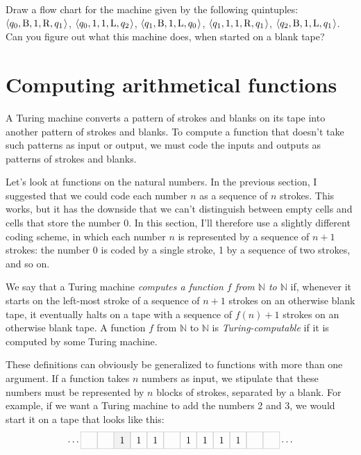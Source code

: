 \begin{exercise}\label{ex:bb3}
  Draw a flow chart for the machine given by the following quintuples:
  $\t{q_0, \mathrm{B}, 1, \mathrm{R}, q_1}$,
  $\t{q_0, 1, 1, \mathrm{L}, q_2}$,
  $\t{q_1, \mathrm{B}, 1, \mathrm{L}, q_{0}}$,
  $\t{q_1, 1, 1, \mathrm{R}, q_{1}}$,
  $\t{q_2, \mathrm{B}, 1, \mathrm{L}, q_{1}}$.
  Can you figure out what this machine does,
  when started on a blank tape?
%
\end{exercise}


\section{Computing arithmetical functions}\label{sec:tm-arith}

A Turing machine converts a pattern of strokes and blanks on its tape into another pattern of strokes and blanks.
To compute a function that
doesn't take such patterns as input or output,
we must code the inputs and outputs as patterns of strokes and blanks.

Let's look at functions on the natural numbers.
In the previous section,
I suggested that we could code each number $n$ as a sequence of $n$ strokes.
This works,
but it has the downside that
we can't distinguish between empty cells and cells that store the number 0.
In this section,
I'll therefore use a slightly different coding scheme,
in which
each number $n$ is represented by a sequence of $n+1$ strokes:
the number 0 is coded by a single stroke,
1 by a sequence of two strokes,
and so on.

We say that a Turing machine
\emph{computes a function $f$ from $\mathbb{N}$ to $\mathbb{N}$}
if,
whenever it starts on the left-most stroke of a sequence of $n+1$ strokes on an otherwise blank tape,
it eventually halts on a tape with a sequence of $f(n) + 1$ strokes on an otherwise blank tape.
A function $f$ from $\mathbb{N}$ to $\mathbb{N}$ is \emph{Turing-computable}
if it is computed by some Turing machine.

These definitions can obviously be generalized to functions with more than one argument.
If a function takes $n$ numbers as input,
we stipulate that
these numbers must be represented by $n$ blocks of strokes,
separated by a blank.
For example,
if we want a Turing machine to add the numbers 2 and 3,
we would start it on a tape that looks like this:
\[
  \ldots \turingtape{{ , ,1,1,1, ,1,1,1,1, , }}{2} \ldots
\]

